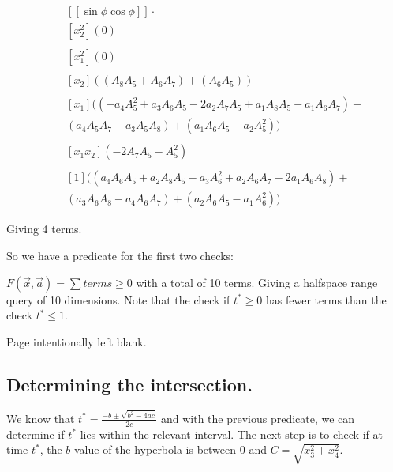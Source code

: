 \documentclass{article}
\begin{document}
\begin{align*}
    &[[\sin \phi \cos \phi]] \cdot  \\
        &[x_2^2](0) \\
    \quad \\
    &[x_1^2] (0) \\
    \quad \\
    &[x_2] ((A_8 A_5+A_6 A_7) + (A_6 A_5)) \\
    \quad \\
    &[x_1] ((-a_4 A_5^2 + a_3 A_6 A_5 - 2 a_2 A_7 A_5 + a_1 A_8 A_5 + a_1 A_6 A_7) + \\
    &(a_4 A_5 A_7 - a_3 A_5 A_8) +(a_1 A_6 A_5 -a_2 A_5^2 )) \\
    \quad \\
    &[x_1 x_2] (-2 A_7 A_5 - A_5^2) \\
    \quad \\
    &[1] ((a_4 A_6 A_5 + a_2 A_8 A_5 - a_3 A_6^2 + a_2 A_6 A_7 - 2 a_1 A_6 A_8) + \\
    &(a_3 A_6 A_8- a_4 A_6 A_7)+ (a_2 A_6 A_5 - a_1 A_6^2))
\end{align*}

Giving 4 terms.



So we have a predicate for the first two checks:

$F(\vec{x}, \vec{a}) = \sum terms \ge 0$ with a total of 10 terms. Giving a halfspace range query of 10 dimensions. 
Note that the check if $t^* \ge 0$ has fewer terms than the check $t^* \le 1$.


\newpage

Page intentionally left blank.
\newpage


\subsection{Determining the intersection.}

We know that $t^* = \frac{-b \pm \sqrt{b^2 - 4ac}}{2c}$ and with the previous predicate, we can determine if $t^*$ lies within the relevant interval. The next step is to check if at time $t^*$, the $b$-value of the hyperbola is between $0$ and $C = \sqrt{x_3^2 + x_4^2}$.
\end{document}
